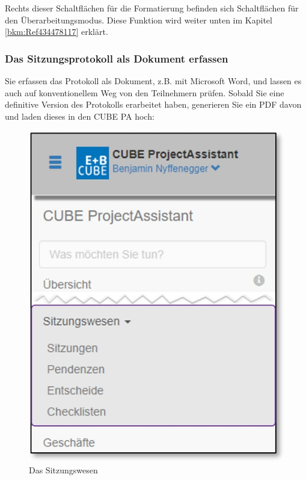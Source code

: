 \vspace{\baselineskip}

\begin{sloppypar}
Rechts dieser Schaltflächen für die Formatierung befinden sich Schaltflächen für den Überarbeitungsmodus. Diese Funktion wird weiter unten im Kapitel \ref{bkm:Ref434478117} erklärt.
\end{sloppypar}

\subsubsection{Das Sitzungsprotokoll als Dokument erfassen}

Sie erfassen das Protokoll als Dokument, z.B. mit Microsoft Word, und lassen es auch auf konventionellem Weg von den Teilnehmern prüfen. Sobald Sie eine definitive Version des Protokolls erarbeitet haben, generieren Sie ein PDF davon und laden dieses in den CUBE PA hoch:

\vspace{\baselineskip}

\begin{figure}   %
  \vspace{-35pt}      %
  \begin{center}
    \includegraphics[width=1\linewidth]{../chapters/05_Sitzungswesen/pictures/5-1_Menu_Sitzungswesen.jpg}
  \end{center}
  \vspace{-20pt}
  \caption{Das Sitzungswesen}
  \vspace{-10pt}
\end{figure}

